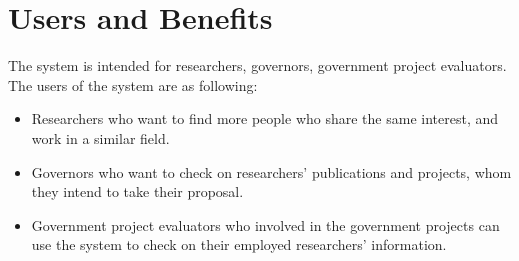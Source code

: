 \section{Users and Benefits}
\label{sec:users}
The system is intended for researchers, governors, government project evaluators. The users of the system are as following:
\begin{itemize}
	\item Researchers who want to find more people who share the same interest, and work in a similar field.
	\item Governors who want to check on researchers' publications and projects, whom they intend to take their proposal.
	\item Government project evaluators who involved in the government projects can use the system to check on their employed researchers' information.
\end{itemize}